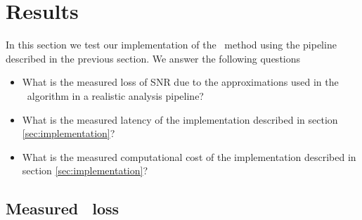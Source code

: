 \section{Results}
\label{SECIV}\label{sec:results}

In this section we test our implementation of the \lloid\ method using the
pipeline described in the previous section.  We answer the following questions
\begin{itemize}
\item What is the measured loss of SNR due to the approximations used in the \lloid\ algorithm in a realistic analysis pipeline?
\item What is the measured latency of the implementation described in section 
\ref{sec:implementation}?
\item What is the measured computational cost of the implementation described in section
\ref{sec:implementation}?
\end{itemize}  

\subsection{Measured \SNR\ loss}

